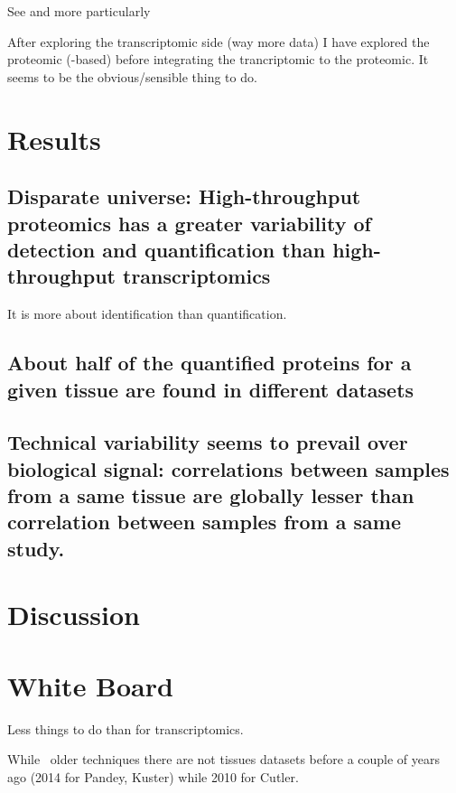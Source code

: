 See  and more particularly 

After exploring the transcriptomic side (way more data) I have explored the
proteomic (\ms-based) before integrating the trancriptomic to the proteomic.
It seems to be the obvious/sensible thing to do.


\section{Results}


\subsection{Disparate universe: High-throughput proteomics has a greater
variability of detection and quantification than high-throughput transcriptomics}

It is more about identification than quantification.

\subsection{About half of the quantified proteins for a given tissue are found
in different datasets}

\subsection{Technical variability seems to prevail over biological signal:
correlations between samples from a same tissue are globally lesser than
correlation between samples from a same study.}


\section{Discussion}





\section{White Board}

Less things to do than for transcriptomics.

While \ms\ older techniques there are not tissues datasets before a couple of
years ago (2014 for Pandey, Kuster) while 2010 for Cutler.



